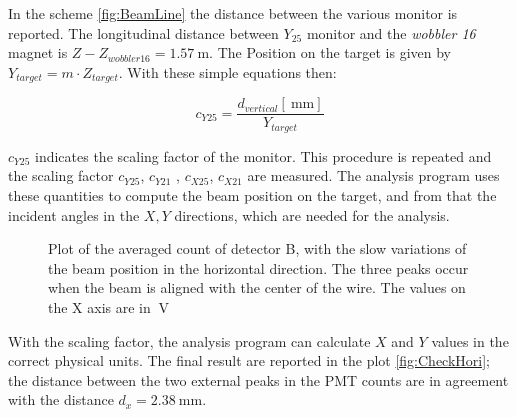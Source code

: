 In the scheme \ref{fig:BeamLine} the distance between the various monitor is reported. The longitudinal distance between $Y_{25}$ monitor and the \textit{wobbler 16} magnet is $Z - Z_{wobbler16} = \SI{1.57}{\meter}$. The Position on the target is given by $Y_{target} = m \cdot Z_{target}$. With these simple equations then:

\begin{equation}
c_{Y25} = \dfrac{d_{vertical} [\SI{}{\milli \meter}]}{ Y_{target}} 
\end{equation}

$c_{Y25}$ indicates the scaling factor of the monitor. This procedure is repeated and the scaling factor $c_{Y25}$, $c_{Y21}$ , $c_{X25}$, $c_{X21}$ are measured. The analysis program uses these quantities to compute the beam position on the target, and from that the incident angles in the $X,Y$ directions, which are needed for the analysis.

\begin{figure}[hbtp]
\centering
{}
\caption{Plot of the averaged count of detector B, with the slow variations of the beam position in the horizontal direction. The three peaks occur when the beam is aligned with the center of the wire. The values on the X axis are in $\SI{}{\volt}$}
\label{fig:HorizontalCalibration}
\end{figure}

With the scaling factor, the analysis program can calculate $X$ and $Y$ values in the correct physical units. The final result are reported in the plot \ref{fig:CheckHori}; the distance between the two external peaks in the PMT counts are in agreement with the distance $d_{x}  = \SI{2.38}{\milli \meter}$.
 
